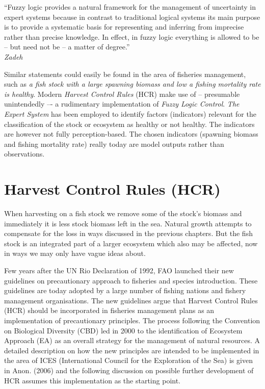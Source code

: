 \documentclass[11pt,fleqn]{book} %
\begin{document}
\begin{corollary}
\hfill \break
\small \indent \enquote{Fuzzy logic provides a natural framework for the management of uncertainty in expert systems because \textendash  in contrast to traditional logical systems \textendash  its main purpose is to provide a systematic basis for representing and inferring from imprecise rather than precise knowledge. In effect, in fuzzy logic everything is allowed to be -- but need not be -- a matter of degree.} \\ \small{\textit{Zadeh}\cite{Zadeh1983}
}
\label{highlight:fuzzylogic}
\end{corollary}

Similar statements could easily be found in the area of fisheries management, such as \textit{a fish stock with a large spawning biomass and low a fishing mortality rate is healthy}. Modern \textit{Harvest Control Rules} (HCR) make use of -- presumable unintendedly –- a rudimentary implementation of \textit{Fuzzy Logic Control}. \textit{The Expert System} has been employed to identify factors (indicators) relevant for the classification of the stock or ecosystem as healthy or not healthy. The indicators are however not fully perception-based. The chosen indicators (spawning biomass and fishing mortality rate) really today are model outputs rather than observations.

\section{Harvest Control Rules (HCR)} \label{HCR}

When harvesting on a fish stock we remove some of the stock's biomass and immediately it is less stock biomass left in the sea. Natural growth attempts to compensate for the loss in ways discussed in the previous chapters. But the fish stock is an integrated part of a larger ecosystem which also may be affected, now in ways we may only have vague ideas about.

Few years after the UN Rio Declaration of 1992, FAO launched their new guidelines on precautionary approach to fisheries and species introduction. These guidelines are today adopted by a large number of fishing nations and fishery management organisations\cite{Punt2006}. The new guidelines argue that Harvest Control Rules (HCR) should be incorporated in fisheries management plans as an implementation of precautionary principles. The process following the Convention on Biological Diversity (CBD) led in 2000 to the identification of Ecosystem Approach (EA) as an overall strategy for the management of natural resources. A detailed description on how the new principles are intended to be implemented in the area of ICES (International Council for the Exploration of the Sea) is given in Anon. (2006) and the following discussion on possible further development of HCR assumes this implementation as the starting point.
\end{document}
